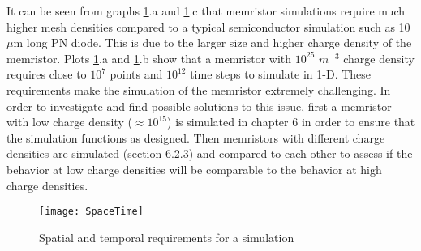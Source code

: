 \begin{doublespace}
It can be seen from graphs \ref{SpaceTime}.a and \ref{SpaceTime}.c that memristor simulations require much higher mesh densities compared to a typical semiconductor simulation such as 10 $\mu$m long PN diode. This is due to the larger size and higher charge density of the memristor. Plots \ref{SpaceTime}.a and \ref{SpaceTime}.b show that a memristor with $10^{25}$ $m^{-3}$ charge density requires close to $10^7$ points and $10^{12}$ time steps to simulate in 1-D. These requirements make the simulation of the memristor extremely challenging. In order to investigate and find possible solutions to this issue, first a memristor with low charge density ($\approx 10^{15}$) is simulated in chapter 6 in order to ensure that the simulation functions as designed. Then memristors with different charge densities are simulated (section 6.2.3) and compared to each other to assess if the behavior at low charge densities will be comparable to the behavior at high charge densities.


\begin{landscape}
\begin{figure}[htp]
\centering
\texttt{[image: SpaceTime]}
\caption{Spatial and temporal requirements for a simulation} 
\label{SpaceTime}
\end{figure}
\end{landscape}

\end{doublespace}
